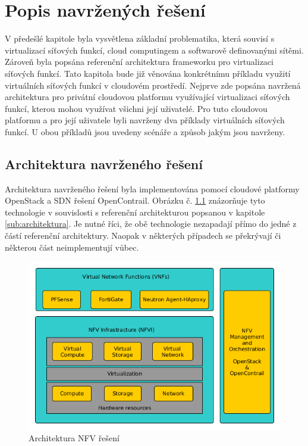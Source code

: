\chapter{Popis navržených řešení}

V předešlé kapitole byla vysvětlena základní problematika, která souvisí s virtualizací síťových funkcí, cloud computingem a softwarově definovanými sítěmi. Zároveň byla popsána referenční architektura frameworku pro virtualizaci síťových funkcí. Tato kapitola bude již věnována konkrétnímu příkladu využití virtuálních síťových funkcí v cloudovém prostředí. Nejprve zde popsána navržená architektura pro privátní cloudovou platformu využívající virtualizaci síťových funkcí, kterou mohou využívat všichni její uživatelé. Pro tuto cloudovou platformu a pro její uživatele byli navrženy dva příklady virtuálních síťových funkcí. U obou příkladů jsou uvedeny scénáře a způsob jakým jsou navrženy.

\section{Architektura navrženého řešení}

Architektura navrženého řešení byla implementována pomocí cloudové platformy OpenStack a SDN řešení OpenContrail. Obrázku č. \ref{fig:VNF_overview} znázorňuje tyto technologie v souvislosti s referenční architekturou popsanou v kapitole \ref{sub:architektura}. Je nutné říci, že obě technologie nezapadají přímo do jedné z částí referenční architektury. Naopak v některých případech se překrývají či některou část neimplementují vůbec.

\begin{figure}[h]
\begin{centering}
\includegraphics[scale=0.51]{images/VNF_overview}
\par\end{centering}
\caption{Architektura NFV řešení\label{fig:VNF_overview}}
\end{figure}

